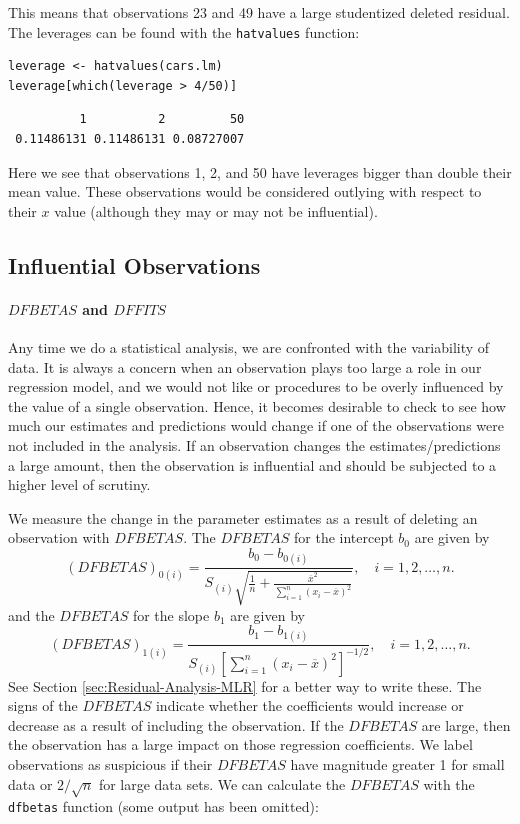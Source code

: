 \documentclass[captions=tableheading]{scrbook}
\begin{document}
This means that observations 23 and 49 have a large studentized deleted residual. The leverages can be found with the \texttt{hatvalues} function:


\begin{verbatim}
leverage <- hatvalues(cars.lm)
leverage[which(leverage > 4/50)]
\end{verbatim}

\begin{verbatim}
          1          2         50 
 0.11486131 0.11486131 0.08727007
\end{verbatim}

Here we see that observations 1, 2, and 50 have leverages bigger than double their mean value. These observations would be considered outlying with respect to their \(x\) value (although they may or may not be influential).
\subsection{Influential Observations}
\label{sec-11-5-4}


\paragraph*{\(DFBETAS\) and \(DFFITS\)}

Any time we do a statistical analysis, we are confronted with the variability of data. It is always a concern when an observation plays too large a role in our regression model, and we would not like or procedures to be overly influenced by the value of a single observation. Hence, it becomes desirable to check to see how much our estimates and predictions would change if one of the observations were not included in the analysis. If an observation changes the estimates/predictions a large amount, then the observation is influential and should be subjected to a higher level of scrutiny.

We measure the change in the parameter estimates as a result of deleting an observation with \(DFBETAS\). The \(DFBETAS\) for the intercept \(b_{0}\) are given by
\begin{equation}
(DFBETAS)_{0(i)}=\frac{b_{0}-b_{0(i)}}{S_{(i)}\sqrt{\frac{1}{n}+\frac{\overline{x}^{2}}{\sum_{i=1}^{n}(x_{i}-\overline{x})^{2}}}},\quad i=1,2,\ldots,n.
\end{equation}
and the \(DFBETAS\) for the slope \(b_{1}\) are given by
\begin{equation}
(DFBETAS)_{1(i)}=\frac{b_{1}-b_{1(i)}}{S_{(i)}\left[\sum_{i=1}^{n}(x_{i}-\overline{x})^{2}\right]^{-1/2}},\quad i=1,2,\ldots,n.
\end{equation}
See Section \ref{sec:Residual-Analysis-MLR} for a better way to write these. The signs of the \(DFBETAS\) indicate whether the coefficients would increase or decrease as a result of including the observation. If the \(DFBETAS\) are large, then the observation has a large impact on those regression coefficients. We label observations as suspicious if their \(DFBETAS\) have magnitude greater 1 for small data or \(2/\sqrt{n}\) for large data sets.
We can calculate the \(DFBETAS\) with the \texttt{dfbetas} function (some output has been omitted):
\end{document}
